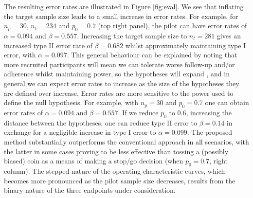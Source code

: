 \documentclass[AMA,STIX1COL]{WileyNJD-v2}
\begin{document}
 
The resulting error rates are illustrated in Figure \ref{fig:eval}. We see that inflating the target sample size leads to a small increase in error rates. For example, for $n_p = 30$, $n_t = 234$ and $p_0 = 0.7$ (top right panel), the pilot can have error rates of $\alpha = 0.094$ and $\beta = 0.557$. Increasing the target sample size to $n_t = 281$ gives an increased type II error rate of $\beta = 0.682$ whilst approximately maintaining type I error, with $\alpha = 0.097$. This general behaviour can be explained by noting that more recruited participants will mean we can tolerate worse follow-up and/or adherence whilst maintaining power, so the hypotheses will expand , and in general we can expect error rates to increase as the size of the hypotheses they are defined over increase. Error rates are more sensitive to the power used to define the null hypothesis. For example, with $n_p = 30$ and $p_0 = 0.7$ one can obtain error rates of $\alpha = 0.094$ and $\beta = 0.557$. If we reduce $p_0$ to 0.6, increasing the distance between the hypotheses, one can reduce type II error to $\beta = 0.14$ in exchange for a negligible increase in type I error to $\alpha = 0.099$. The proposed method substantially outperforms the conventional approach in all scenarios, with the latter in some cases proving to be less effective than tossing a (possibly biased) coin as a means of making a stop/go decision (when $p_0 = 0.7$, right column). The stepped nature of the operating characteristic curves, which becomes more pronounced as the pilot sample size decreases, results from the binary nature of the three endpoints under consideration.
\end{document}
